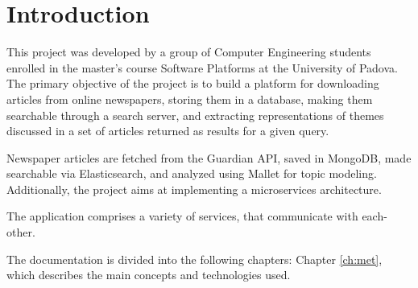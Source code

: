 \section{Introduction}
\label{ch:in}
This project was developed by a group of Computer Engineering students enrolled in the master's
course Software Platforms at the University of Padova. The primary objective of the project is
to build a platform for downloading articles from online newspapers, storing them in a database,
making them searchable through a search server, and extracting representations of themes discussed
in a set of articles returned as results for a given query.

Newspaper articles are fetched from the Guardian API, saved in MongoDB, made searchable via
Elasticsearch, and analyzed using Mallet for topic modeling.
Additionally, the project aims at
implementing a microservices architecture.

The application comprises a variety of services, that communicate with each-other.

The documentation is divided into the following chapters: Chapter \ref{ch:met}, which describes
the main concepts and technologies used. %
